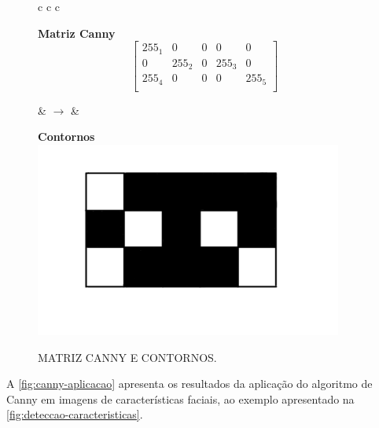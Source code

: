 \begin{figure}[ht]
    \caption{MATRIZ CANNY E CONTORNOS.}
    \label{fig:canny-contornos}
    \centering
    \begin{tabular}{c c c}
        \begin{minipage}{0.4\textwidth}
            \centering
            \textbf{Matriz Canny}\\ [0.2cm]
            \[
            \begin{bmatrix}
                255_1 & 0 & 0 & 0 & 0 \\
                0 & 255_2 & 0 & 255_3 & 0 \\
                255_4 & 0 & 0 & 0 & 255_5 \\
            \end{bmatrix}
            \]
        \end{minipage}
        \hspace{0.5cm}
        
        & $\rightarrow$ &
        \begin{minipage}{0.4\textwidth}
            \centering
            \textbf{Contornos}\\ [0.2cm]
            \includegraphics[width=0.9\textwidth]{fig/contorno_canny.jpeg}
        \end{minipage}
    \end{tabular}
\end{figure}

A \autoref{fig:canny-aplicacao} apresenta os resultados da aplicação do algoritmo de Canny em imagens de características faciais, ao exemplo apresentado na \autoref{fig:deteccao-caracteristicas}. 



